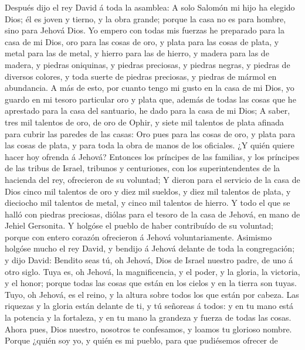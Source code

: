  Después dijo el rey David á toda la asamblea: A solo
Salomón mi hijo ha elegido Dios; él es joven y tierno, y la obra grande;
porque la casa no es para hombre, sino para Jehová Dios. 
Yo empero con todas mis fuerzas he preparado para la casa de mi Dios,
oro para las cosas de oro, y plata para las cosas de plata, y metal para
las de metal, y hierro para las de hierro, y madera para las de madera,
y piedras oniquinas, y piedras preciosas, y piedras negras, y piedras de
diversos colores, y toda suerte de piedras preciosas, y piedras de
mármol en abundancia.  A más de esto, por cuanto tengo mi
gusto en la casa de mi Dios, yo guardo en mi tesoro particular oro y
plata que, además de todas las cosas que he aprestado para la casa del
santuario, he dado para la casa de mi Dios;  A saber, tres
mil talentos de oro, de oro de Ophir, y siete mil talentos de plata
afinada para cubrir las paredes de las casas:  Oro pues
para las cosas de oro, y plata para las cosas de plata, y para toda la
obra de manos de los oficiales. ¿Y quién quiere hacer hoy ofrenda á
Jehová?  Entonces los príncipes de las familias, y los
príncipes de las tribus de Israel, tribunos y centuriones, con los
superintendentes de la hacienda del rey, ofrecieron de su voluntad;
 Y dieron para el servicio de la casa de Dios cinco mil
talentos de oro y diez mil sueldos, y diez mil talentos de plata, y
dieciocho mil talentos de metal, y cinco mil talentos de hierro.
 Y todo el que se halló con piedras preciosas, diólas para
el tesoro de la casa de Jehová, en mano de Jehiel Gersonita.
 Y holgóse el pueblo de haber contribuído de su voluntad;
porque con entero corazón ofrecieron á Jehová voluntariamente.
 Asimismo holgóse mucho el rey David, y bendijo á Jehová
delante de toda la congregación; y dijo David: Bendito seas tú, oh
Jehová, Dios de Israel nuestro padre, de uno á otro siglo.
 Tuya es, oh Jehová, la magnificencia, y el poder, y la
gloria, la victoria, y el honor; porque todas las cosas que están en los
cielos y en la tierra son tuyas. Tuyo, oh Jehová, es el reino, y la
altura sobre todos los que están por cabeza.  Las
riquezas y la gloria están delante de ti, y tú señoreas á todos: y en tu
mano está la potencia y la fortaleza, y en tu mano la grandeza y fuerza
de todas las cosas.  Ahora pues, Dios nuestro, nosotros
te confesamos, y loamos tu glorioso nombre.  Porque
¿quién soy yo, y quién es mi pueblo, para que pudiésemos ofrecer de
